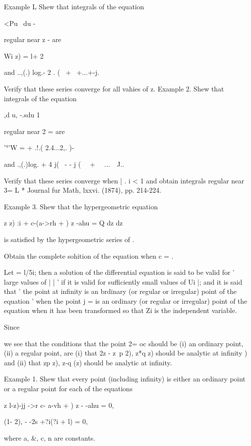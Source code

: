 Example L Shew that integrals of the equation

<Pu \ du -

regular near z - are

Wi z) = l+ 2

and ..,(.) log.- 2 . ( \ + \ +...+-j.

Verify that these series converge for all vahies of z. Example 2. Shew
that integrals of the equation

,d u, -.sdu 1

regular near 2 = are

'°'W = + .!.( 2.4...2,. )-

and .,(.)log. + 4 j( \ - - j ( \ \ + \ \ ...\ \ J..

Verify that these series converge when | . i < 1 and obtain integrals
regular near 3= L * Journal fur Math, lxxvi. (1874), pp. 214-224.

%
%

Example 3. Shew that the hypergeometric equation

z z) :i + c-(a->rh + ) z -ahu = Q dz dz

is satisfied by the hypergeometric series of .

Obtain the complete sohition of the equation when c = .


Let = l/5i; then a solution of the differential equation is said to be
valid for ' large values of | | ' if it is valid for sufficiently
small values of Ui |; and it is said that ' the point at infinity is
an brdinary (or regular or irregular) point of the equation ' when the
point j = is an ordinary (or regular or irregular) point of the
equation when it has been transformed so that Zi is the independent
variable.

Since

we see that the conditions that the point 2= oc should be (i) an
ordinary point, (ii) a regular point, are (i) that 2z - z~p 2), z*q z)
should be analytic at infinity ) and (ii) that zp z), z-q (z)
should be analytic at infinity.

Example 1. Shew that every point (including infinity) is either an
ordinary point or a regular point for each of the equations

z l-z)-jj ->r c- a-vh + ) z - -ahu = 0,

(1- 2), - -2s +?i(?i + l) = 0,

where a, \&, c, n are constants.

